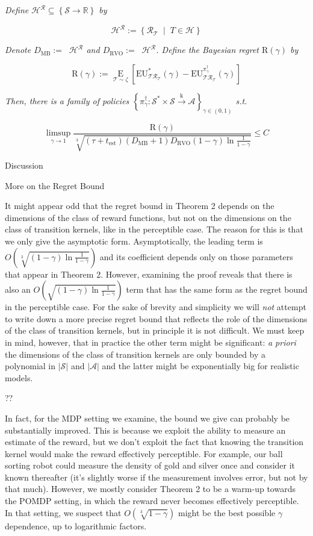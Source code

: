 \documentclass[a4paper]{article}
\newcommand{\Co}[1]{}
\newcommand{\AP}[1]{\left(#1\right)}
\newcommand{\AB}[1]{\left[#1\right]}
\newcommand{\AC}[1]{\left\{#1\right\}}
\newcommand{\ACM}[2]{\left\{#1\;\middle\vert\;#2\right\}}
\newcommand{\Abs}[1]{\left\vert #1 \right\vert}
\newcommand{\Ea}[2]{\underset{#1}{\operatorname{E}}\AB{#2}}
\newcommand{\Reals}{\mathbb{R}}
\newcommand{\K}{\xrightarrow{\mathrm{k}}}
\newcommand{\St}{\mathcal{S}}
\newcommand{\A}{\mathcal{A}}
\newcommand{\R}{\mathcal{R}}
\newcommand{\T}{\mathcal{T}}
\newcommand{\Hy}{\mathcal{H}}
\DeclareMathOperator{\RVO}{\dim_{RVO}}
\DeclareMathOperator{\MB}{\dim_{MB}}
\newcommand{\DRVO}{D_{\mathrm{RVO}}}
\newcommand{\DMB}{D_{\mathrm{MB}}}
\newcommand{\EU}{\mathrm{EU}}
\newcommand{\Reg}{\mathrm{R}}
\begin{document}
\textit{Define $\Hy^\R\subseteq\AC{\St\rightarrow\Reals}$ by}\Co{i}

$$\Hy^\R:=\ACM{\R_\T}{T\in\Hy}$$

\textit{Denote $\DMB:=\MB{\Hy^\R}$ and $\DRVO:=\RVO{\Hy^\R}$. Define the Bayesian regret $\Reg(\gamma)$ by}

$$\Reg(\gamma):=\Ea{\T\sim\zeta}{\EU^*_{\T\R_\T}(\gamma)-\EU^{\pi^\dagger_\gamma}_{\T\R_\T}(\gamma)}$$

\textit{Then, there is a family of policies $\AC{\pi^\dagger_\gamma:\St^*\times\St\K\A}_{\gamma\in(0,1)}$ s.t.}\Co{i}

$$\limsup_{\gamma \rightarrow 1}\frac{\Reg(\gamma)}{\sqrt[3]{\AP{\tau+t_{\mathrm{est}}}\AP{\DMB+1}\DRVO(1-\gamma)\ln{\frac{1}{1-\gamma}}}}\leq C$$

\begin{Huge}Discussion\end{Huge}

\begin{Large}More on the Regret Bound\end{Large}

It might appear odd that the regret bound in Theorem 2 depends on the dimensions of the class of reward functions, but not on the dimensions on the class of transition kernels, like in the perceptible case. The reason for this is that we only give the asymptotic form. Asymptotically, the leading term is $O\AP{\sqrt[3]{\AP{1-\gamma}\ln{\frac{1}{1-\gamma}}}}$ and its coefficient depends only on those parameters that appear in Theorem 2. However, examining the proof reveals that there is also an $O\AP{\sqrt{\AP{1-\gamma}\ln{\frac{1}{1-\gamma}}}}$ term that has the same form as the regret bound in the perceptible case. For the sake of brevity and simplicity we will \textit{not}\Co{i} attempt to write down a more precise regret bound that reflects the role of the dimensions of the class of transition kernels, but in principle it is not difficult. We must keep in mind, however, that in practice the other term might be significant: \textit{a priori}\Co{i} the dimensions of the class of transition kernels are only bounded by a polynomial in $\Abs{\St}$ and $\Abs{\A}$ and the latter might be exponentially big for realistic models. 

?? %

In fact, for the MDP setting we examine, the bound we give can probably be substantially improved. This is because we exploit the ability to measure an estimate of the reward, but we don't exploit the fact that knowing the transition kernel would make the reward effectively perceptible. For example, our ball sorting robot could measure the density of gold and silver once and consider it known thereafter (it's slightly worse if the measurement involves error, but not by that much). However, we mostly consider Theorem 2 to be a warm-up towards the POMDP setting, in which the reward never becomes effectively perceptible. In that setting, we suspect that $O\AP{\sqrt[3]{1-\gamma}}$ might be the best possible $\gamma$ dependence, up to logarithmic factors.
\end{document}
